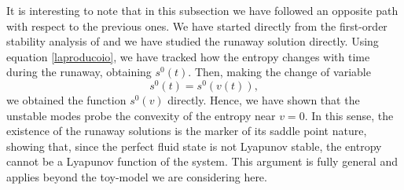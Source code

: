 \documentclass[a4paper, amsfonts, amssymb, amsmath, reprint, showkeys, nofootinbib, twoside]{revtex4-1}
\begin{document}
It is interesting to note that in this subsection we have followed an opposite path with respect to the previous ones. We have started directly from the first-order stability analysis of \cite{Hiscock_Insatibility_first_order} and we have studied the runaway solution directly. Using equation \eqref{laproducoio}, we have tracked how the entropy changes with time during the runaway, obtaining $s^0(t)$. Then, making the change of variable
\begin{equation}
s^0(t)=s^0(v(t)),
\end{equation}
we obtained the function $s^0(v)$ directly. 
Hence, we have shown that the unstable modes probe the convexity of the entropy near $v=0$. In this sense, the existence of the runaway solutions is the marker of its saddle point nature, showing that, since the perfect fluid state is not Lyapunov stable, the entropy cannot be a Lyapunov function of the system. 
This argument is fully general and applies beyond the toy-model we are considering here.


%
\end{document}
